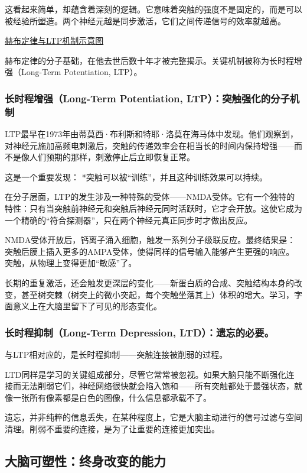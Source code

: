 \documentclass[11pt]{article}
\begin{document}
这看起来简单，却蕴含着深刻的逻辑。它意味着突触的强度不是固定的，而是可以被经验所塑造。两个神经元越是同步激活，它们之间传递信号的效率就越高。

\href{file:///c:/Users/fupen/org/book/插图/赫布定律与LTP机制示意图.png}{赫布定律与LTP机制示意图}

赫布定律的分子基础，在他去世后数十年才被完整揭示。关键机制被称为长时程增强（Long-Term Potentiation, LTP）。
\subsubsection{长时程增强（Long-Term Potentiation, LTP）：突触强化的分子机制}
\label{sec:org21b6a44}

LTP最早在1973年由蒂莫西·布利斯和特耶·洛莫在海马体中发现。他们观察到，对神经元施加高频电刺激后，突触的传递效率会在相当长的时间内保持增强——而不是像人们预期的那样，刺激停止后立即恢复正常。

这是一个重要发现： *突触可以被“训练”，并且这种训练效果可以持续。

在分子层面，LTP的发生涉及一种特殊的受体——NMDA受体。它有一个独特的特性：只有当突触前神经元和突触后神经元同时活跃时，它才会开放。这使它成为一个精确的“符合探测器”，只在两个神经元真正同步时才做出反应。

NMDA受体开放后，钙离子涌入细胞，触发一系列分子级联反应。最终结果是：突触后膜上插入更多的AMPA受体，使得同样的信号输入能够产生更强的响应。突触，从物理上变得更加“敏感”了。

长期的重复激活，还会触发更深层的变化——新蛋白质的合成、突触结构本身的改变，甚至树突棘（树突上的微小突起，每个突触坐落其上）体积的增大。学习，字面意义上在大脑里留下了可见的形态变化。
\subsubsection{长时程抑制（Long-Term Depression, LTD）：遗忘的必要。}
\label{sec:org4ffe882}

与LTP相对应的，是长时程抑制——突触连接被削弱的过程。

LTD同样是学习的关键组成部分，尽管它常常被忽视。如果大脑只能不断强化连接而无法削弱它们，神经网络很快就会陷入饱和——所有突触都处于最强状态，就像一张所有像素都是白色的图像，什么信息都承载不了。

遗忘，并非纯粹的信息丢失，在某种程度上，它是大脑主动进行的信号过滤与空间清理。削弱不重要的连接，是为了让重要的连接更加突出。
\subsection{大脑可塑性：终身改变的能力}
\label{sec:orgc1f9195}
\end{document}
